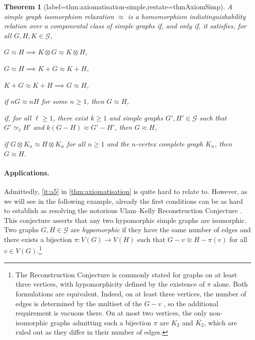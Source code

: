 \documentclass[11pt]{scrartcl}
\theoremstyle{definition}
\theoremstyle{plain}
\newtheorem{theorem}[definition]{Theorem}
\theoremstyle{remark}
\newcommand{\G}{\mathcal{G}}
\begin{document}
	\begin{theorem}[label=thm:axiomatisation-simple,restate=thmAxiomSimp]
		A simple graph isomorphism relaxation $\approx$ is a homomorphism indistinguishability relation
		over a componental class of simple graphs if, and only if,
		it satisfies, for all $G, H, K \in \G$,
		\begin{assertions}
			\item\label{it:s1} $G \approx H \implies K \otimes G \approx K \otimes H$,
			\item\label{it:s2} $G \approx H \implies K + G \approx K + H$,
			\item\label{it:s3} $K + G \approx K + H \implies G \approx H$,
			\item\label{it:s4} if $nG \approx nH $ for some $n\geq1$, then $ G \approx H$,
			\item\label{it:s5} if, for all $\ell \geq 1$, there exist $k \geq 1$ and simple graphs $G', H' \in \G$
			such that $G' \simeq_\ell H'$ and $k(G-H) \approx G' - H'$, then $G \approx H$,
			\item\label{it:s6} if $G \otimes K_n \approx H \otimes K_n$ for all $n \geq 1$ and the $n$-vertex complete graph $K_n$, then $G \approx H$.
		\end{assertions}
	\end{theorem}



    \paragraph{Applications.}
	Admittedly, \cref{it:a5} in \cref{thm:axiomatisation} is quite hard to relate to. 
	However, as we will see in the following example, already the first conditions can be as hard to establish as resolving the notorious Ulam--Kelly Reconstruction Conjecture \cite{ulam_collection_1960,kelly_congruence_1957}.
	This conjecture asserts that any two hypomorphic simple graphs are isomorphic.
	Two graphs $G, H \in \G$ are \emph{hypomorphic} if they have the same number of edges and there exists a bijection $\pi \colon V(G) \to V(H)$
	such that $G - v \cong H- \pi(v)$ for all $v \in V(G)$.\footnote{The Reconstruction Conjecture is commonly stated for graphs on at least three vertices,
	with hypomorphicity defined by the existence of $\pi$ alone.
	Both formulations are equivalent.
	Indeed, on at least three vertices, the number of edges is determined by the multiset of the $G - v$ \cite{kelly_congruence_1957},
	so the additional requirement is vacuous there.
	On at most two vertices, the only non-isomorphic graphs admitting such a bijection $\pi$ are $K_2$ and $\overline{K_2}$,
	which are ruled out as they differ in their number of edges.} 
\end{document}
